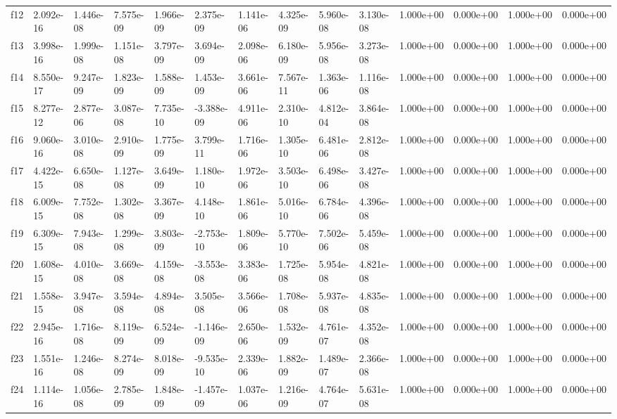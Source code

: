 \begin{table}
\begin{tabular}{llllllllllllll}
f12 & 2.092e-16 & 1.446e-08 & 7.575e-09 & 1.966e-09 & 2.375e-09 & 1.141e-06 & 4.325e-09 & 5.960e-08 & 3.130e-08 & 1.000e+00 & 0.000e+00 & 1.000e+00 & 0.000e+00 \\
f13 & 3.998e-16 & 1.999e-08 & 1.151e-08 & 3.797e-09 & 3.694e-09 & 2.098e-06 & 6.180e-09 & 5.956e-08 & 3.273e-08 & 1.000e+00 & 0.000e+00 & 1.000e+00 & 0.000e+00 \\
f14 & 8.550e-17 & 9.247e-09 & 1.823e-09 & 1.588e-09 & 1.453e-09 & 3.661e-06 & 7.567e-11 & 1.363e-06 & 1.116e-08 & 1.000e+00 & 0.000e+00 & 1.000e+00 & 0.000e+00 \\
f15 & 8.277e-12 & 2.877e-06 & 3.087e-08 & 7.735e-10 & -3.388e-09 & 4.911e-06 & 2.310e-10 & 4.812e-04 & 3.864e-08 & 1.000e+00 & 0.000e+00 & 1.000e+00 & 0.000e+00 \\
f16 & 9.060e-16 & 3.010e-08 & 2.910e-09 & 1.775e-09 & 3.799e-11 & 1.716e-06 & 1.305e-10 & 6.481e-06 & 2.812e-08 & 1.000e+00 & 0.000e+00 & 1.000e+00 & 0.000e+00 \\
f17 & 4.422e-15 & 6.650e-08 & 1.127e-08 & 3.649e-09 & 1.180e-10 & 1.972e-06 & 3.503e-10 & 6.498e-06 & 3.427e-08 & 1.000e+00 & 0.000e+00 & 1.000e+00 & 0.000e+00 \\
f18 & 6.009e-15 & 7.752e-08 & 1.302e-08 & 3.367e-09 & 4.148e-10 & 1.861e-06 & 5.016e-10 & 6.784e-06 & 4.396e-08 & 1.000e+00 & 0.000e+00 & 1.000e+00 & 0.000e+00 \\
f19 & 6.309e-15 & 7.943e-08 & 1.299e-08 & 3.803e-09 & -2.753e-10 & 1.809e-06 & 5.770e-10 & 7.502e-06 & 5.459e-08 & 1.000e+00 & 0.000e+00 & 1.000e+00 & 0.000e+00 \\
f20 & 1.608e-15 & 4.010e-08 & 3.669e-08 & 4.159e-08 & -3.553e-08 & 3.383e-06 & 1.725e-08 & 5.954e-08 & 4.821e-08 & 1.000e+00 & 0.000e+00 & 1.000e+00 & 0.000e+00 \\
f21 & 1.558e-15 & 3.947e-08 & 3.594e-08 & 4.894e-08 & 3.505e-08 & 3.566e-06 & 1.708e-08 & 5.937e-08 & 4.835e-08 & 1.000e+00 & 0.000e+00 & 1.000e+00 & 0.000e+00 \\
f22 & 2.945e-16 & 1.716e-08 & 8.119e-09 & 6.524e-09 & -1.146e-09 & 2.650e-06 & 1.532e-09 & 4.761e-07 & 4.352e-08 & 1.000e+00 & 0.000e+00 & 1.000e+00 & 0.000e+00 \\
f23 & 1.551e-16 & 1.246e-08 & 8.274e-09 & 8.018e-09 & -9.535e-10 & 2.339e-06 & 1.882e-09 & 1.489e-07 & 2.366e-08 & 1.000e+00 & 0.000e+00 & 1.000e+00 & 0.000e+00 \\
f24 & 1.114e-16 & 1.056e-08 & 2.785e-09 & 1.848e-09 & -1.457e-09 & 1.037e-06 & 1.216e-09 & 4.764e-07 & 5.631e-08 & 1.000e+00 & 0.000e+00 & 1.000e+00 & 0.000e+00 \\

\end{tabular}
\end{table}
